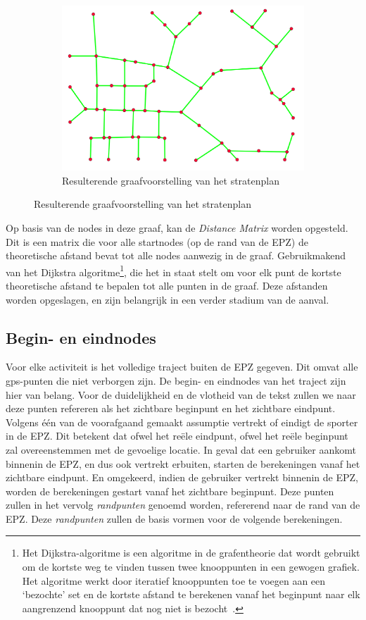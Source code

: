 \begin{figure}[h]
\begin{subfigure}[b]{.4\textwidth}
        \includegraphics[width=1\textwidth]{fig/RoadGraph/Graph.png}
        \caption{Resulterende graafvoorstelling van het stratenplan}
    \end{subfigure}
\end{figure}

Op basis van de nodes in deze graaf, kan de \textit{Distance Matrix} worden
opgesteld. Dit is een matrix die voor alle startnodes (op de rand van de
\ac{EPZ}) de theoretische afstand bevat tot alle nodes aanwezig in de graaf.
Gebruikmakend van het Dijkstra algoritme\footnote{Het Dijkstra-algoritme is een
    algoritme in de grafentheorie dat wordt gebruikt om de kortste weg te vinden
    tussen twee knooppunten in een gewogen grafiek. Het algoritme werkt door
    iteratief knooppunten toe te voegen aan een `bezochte' set en de kortste
    afstand te berekenen vanaf het beginpunt naar elk aangrenzend knooppunt dat nog
    niet is bezocht~\cite{dijkstra}.}, die het in staat stelt om voor elk punt de
kortste theoretische afstand te bepalen tot alle punten in de graaf. Deze
afstanden worden opgeslagen, en zijn belangrijk in een verder stadium van de
aanval.

\subsection{Begin- en eindnodes}
Voor elke activiteit is het volledige traject buiten de \ac{EPZ} gegeven. Dit
omvat alle \ac{gps}-punten die niet verborgen zijn. De begin- en eindnodes van
het traject zijn hier van belang. Voor de duidelijkheid en de vlotheid van de
tekst zullen we naar deze punten refereren als het zichtbare beginpunt en het
zichtbare eindpunt. Volgens één van de voorafgaand gemaakt assumptie vertrekt
of eindigt de sporter in de \ac{EPZ}. Dit betekent dat ofwel het reële
eindpunt, ofwel het reële beginpunt zal overeenstemmen met de gevoelige
locatie. In geval dat een gebruiker aankomt binnenin de \ac{EPZ}, en dus ook
vertrekt erbuiten, starten de berekeningen vanaf het zichtbare eindpunt. En
omgekeerd, indien de gebruiker vertrekt binnenin de \ac{EPZ}, worden de
berekeningen gestart vanaf het zichtbare beginpunt. Deze punten zullen in het
vervolg \textit{randpunten} genoemd worden, refererend naar de rand van de
\ac{EPZ}. Deze \textit{randpunten} zullen de basis vormen voor de volgende
berekeningen.

